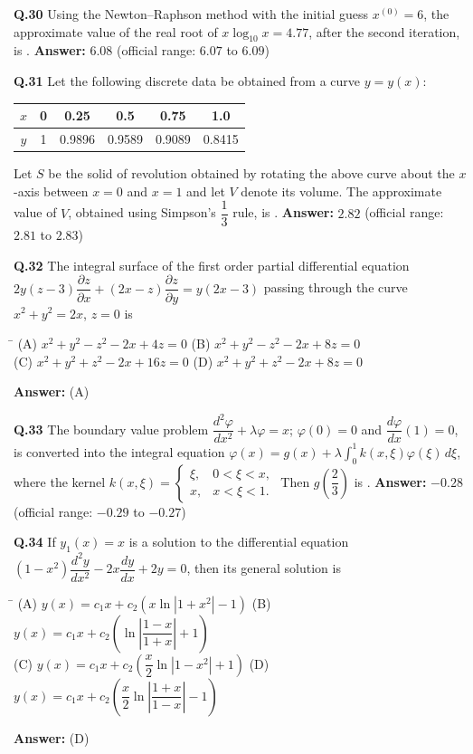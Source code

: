 \documentclass[11pt,a4paper]{article}
\newcommand{\optsfourA}[4]{%
  \begin{tabbing}
    \hspace{0.48\linewidth}\=\kill
    (A) #1 \> (B) #2 \\[2pt]
    (C) #3 \> (D) #4
  \end{tabbing}%
}
\newcommand{\ans}[1]{\textbf{Answer:} #1\par\medskip}
\begin{document}
\textbf{Q.30} Using the Newton--Raphson method with the initial guess $x^{(0)} = 6$, the approximate value of the real root of $x\log_{10} x = 4.77$, after the second iteration, is \underline{\hspace{2cm}}.
\ans{$6.08$ (official range: $6.07$ to $6.09$)}

\textbf{Q.31} Let the following discrete data be obtained from a curve $y = y(x)$:
\begin{center}
\begin{tabular}{cccccc}
  \toprule
  $x$ & 0 & 0.25 & 0.5 & 0.75 & 1.0 \\
  \midrule
  $y$ & 1 & 0.9896 & 0.9589 & 0.9089 & 0.8415 \\
  \bottomrule
\end{tabular}
\end{center}
Let $S$ be the solid of revolution obtained by rotating the above curve about the $x$-axis between $x = 0$ and $x = 1$ and let $V$ denote its volume. The approximate value of $V$, obtained using Simpson's $\dfrac{1}{3}$ rule, is \underline{\hspace{2cm}}.
\ans{$2.82$ (official range: $2.81$ to $2.83$)}

\textbf{Q.32} The integral surface of the first order partial differential equation $2y(z - 3)\dfrac{\partial z}{\partial x} + (2x - z)\dfrac{\partial z}{\partial y} = y(2x - 3)$ passing through the curve $x^2 + y^2 = 2x$, $z = 0$ is
\optsfourA{$x^2 + y^2 - z^2 - 2x + 4z = 0$}{$x^2 + y^2 - z^2 - 2x + 8z = 0$}{$x^2 + y^2 + z^2 - 2x + 16z = 0$}{$x^2 + y^2 + z^2 - 2x + 8z = 0$}
\ans{(A)}

\textbf{Q.33} The boundary value problem $\dfrac{d^2\varphi}{dx^2} + \lambda\varphi = x$; $\varphi(0) = 0$ and $\dfrac{d\varphi}{dx}(1) = 0$, is converted into the integral equation $\varphi(x) = g(x) + \lambda \displaystyle\int_0^1 k(x, \xi)\varphi(\xi)\,d\xi$, where the kernel $k(x, \xi) = \begin{cases} \xi, & 0 < \xi < x, \\ x, & x < \xi < 1. \end{cases}$ Then $g\!\left(\dfrac{2}{3}\right)$ is \underline{\hspace{2cm}}.
\ans{$-0.28$ (official range: $-0.29$ to $-0.27$)}

\textbf{Q.34} If $y_1(x) = x$ is a solution to the differential equation $(1 - x^2)\dfrac{d^2 y}{dx^2} - 2x\dfrac{dy}{dx} + 2y = 0$, then its general solution is
\optsfourA{$y(x) = c_1 x + c_2(x\ln|1 + x^2| - 1)$}{$y(x) = c_1 x + c_2\!\left(\ln\left|\dfrac{1 - x}{1 + x}\right| + 1\right)$}{$y(x) = c_1 x + c_2\!\left(\dfrac{x}{2}\ln|1 - x^2| + 1\right)$}{$y(x) = c_1 x + c_2\!\left(\dfrac{x}{2}\ln\left|\dfrac{1 + x}{1 - x}\right| - 1\right)$}
\ans{(D)}
\end{document}
